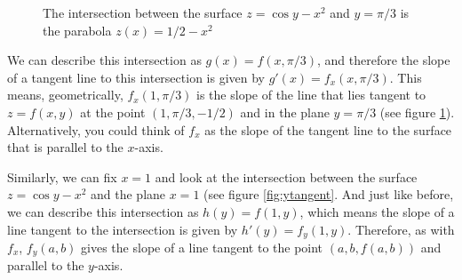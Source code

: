\begin{figure}[htbp]
    \centering
    \caption{The intersection between the surface $z = \cos{y} - x^2$ and $y = 
    \pi/3$ is the parabola $z(x) = 1/2 - x^2$}
    \label{fig:tangent}
\end{figure}

We can describe this intersection as $g(x) = f(x, \pi/3)$, and therefore the 
slope of a tangent line to this intersection is given by $g'(x) = f_x(x, 
\pi/3)$. This means, geometrically, $f_x(1, \pi/3)$ is the slope of the line 
that lies tangent to $z = f(x, y)$ at the point $(1, \pi/3, -1/2)$ and in the 
plane $y = \pi/3$ (see figure \ref{fig:tangent}). Alternatively, you could 
think of $f_x$ as the slope of the tangent line to the surface that is 
parallel to the $x$-axis. 

Similarly, we can fix $x = 1$ and look at the intersection between the surface 
$z = \cos{y} - x^2$ and the plane $x = 1$ (see figure \ref{fig:ytangent}. And 
just like before, we can describe this intersection as $h(y) = f(1, y)$, which 
means the slope of a line tangent to the intersection is given by $h'(y) = 
f_{y}(1, y)$. Therefore, as with $f_x$, $f_y(a, b)$ gives the slope of a line 
tangent to the point $\left(a, b, f(a, b) \right)$ and parallel to the $y$-axis. 

